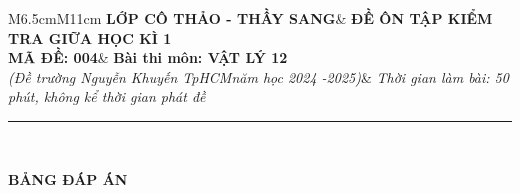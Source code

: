 \begin{tabular}{M{6.5cm}M{11cm}}
	\textbf{LỚP CÔ THẢO - THẦY SANG}& \textbf{ĐỀ ÔN TẬP KIỂM TRA GIỮA HỌC KÌ 1}\\
	\textbf{MÃ ĐỀ: 004}& \textbf{Bài thi môn: VẬT LÝ 12}\\
	\textit{(Đề trường Nguyễn Khuyến TpHCM\newline năm học 2024 -2025)}& \textit{Thời gian làm bài: 50 phút, không kể thời gian phát đề}
	
	\noindent\rule{4cm}{0.8pt} \\
\end{tabular}
\setcounter{section}{0}
\begin{center}
	\textbf{\large BẢNG ĐÁP ÁN}
\end{center}
\section{}
\section{}
\section{}
